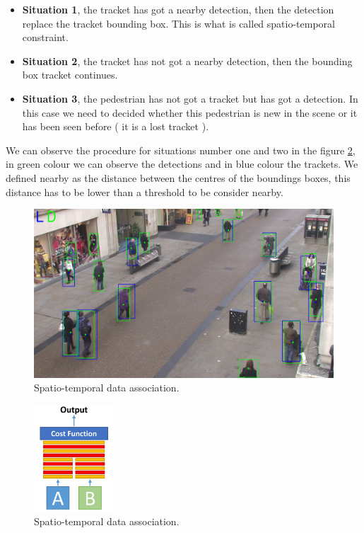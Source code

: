 \begin{itemize}



\item \textbf{Situation 1}, the tracket has got a nearby detection, then the detection replace the tracket bounding box. This is what is called spatio-temporal constraint.

\item \textbf{Situation 2}, the tracket has not got a nearby detection, then the bounding box tracket continues.

\item \textbf{Situation 3}, the pedestrian has not got a tracket but has got a detection. In this case we need to decided whether this pedestrian is new in the scene or it has been seen before ( it is a lost tracket ).

\end{itemize}

We can observe the procedure for situations number one and two in the figure \ref{data1}, in green colour we can observe the detections and in blue colour the trackets. We defined nearby as the distance between the centres of the boundings boxes, this distance has to be lower than a threshold to be consider nearby. 

\begin{figure}[hptb]
\centering         
\includegraphics[width=12cm]{lucasKanade/dataAssociation.jpg}
\caption{Spatio-temporal data association.} \label{data1}
\end{figure}


\begin{figure}[hptb]
\centering         
\includegraphics[width=3cm]{siamese/retall2.png}
\caption{Spatio-temporal data association.} \label{data1}
\end{figure}




